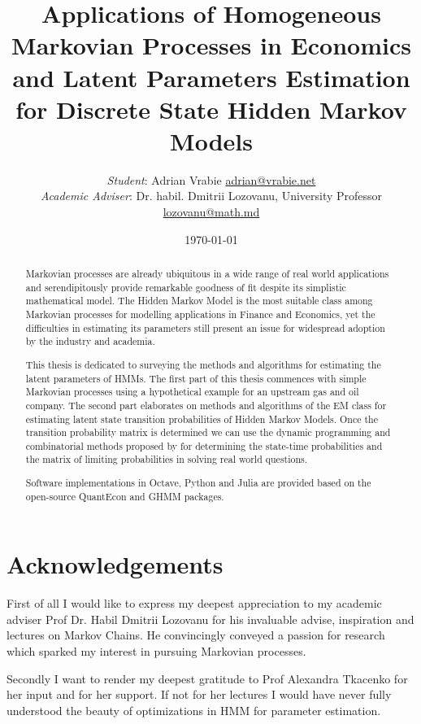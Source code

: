 \documentclass[a4paper,12pt]{article}
\title{\textbf{Applications of Homogeneous Markovian Processes in Economics and Latent Parameters Estimation for Discrete State Hidden Markov Models}}
\author{\textit{Student}: Adrian Vrabie \href{adrian@vrabie.net}{adrian@vrabie.net}\\
		\textit{Academic Adviser}: Dr. habil. Dmitrii Lozovanu, University Professor \\
\href{lozovanu@math.md}{lozovanu@math.md}}
\date{\today}
\theoremstyle{definition}
\begin{document}
\maketitle
\begin{abstract}
Markovian processes are already ubiquitous in a wide range of real world applications and serendipitously provide remarkable goodness of fit despite its simplistic mathematical model.  The Hidden Markov Model is the most suitable class among Markovian processes for modelling applications in Finance and Economics, yet the difficulties in estimating its parameters still present an issue for widespread adoption by the industry and academia. 

This thesis is dedicated to surveying the methods and algorithms for estimating the latent parameters of HMMs. The first part of this thesis commences with simple Markovian processes using a hypothetical example for an upstream gas and oil company. The second part elaborates on methods and algorithms of the EM class for estimating latent state transition probabilities of Hidden Markov Models. 
Once the transition probability matrix is determined we can use the dynamic programming and combinatorial methods proposed by \cite{Lozovanu15} for determining the state-time probabilities and the matrix of limiting probabilities in solving real world questions.

Software implementations in Octave, Python and Julia are provided based on the open-source QuantEcon  and GHMM packages.

\end{abstract}
\newpage
\tableofcontents
\newpage
\listoffigures



\newpage
\setcounter{secnumdepth}{0}
\section{Acknowledgements}
\setcounter{secnumdepth}{1}
First of all I would like to express my deepest appreciation to my academic adviser Prof Dr. Habil Dmitrii Lozovanu for his invaluable advise, inspiration and lectures on Markov Chains. He convincingly conveyed a passion for research which sparked my interest in pursuing Markovian processes.

Secondly I want to render my deepest gratitude to Prof Alexandra Tkacenko for her input and for her support. If not for her lectures I would have never fully understood the beauty of optimizations in HMM for parameter estimation. 
\end{document}
